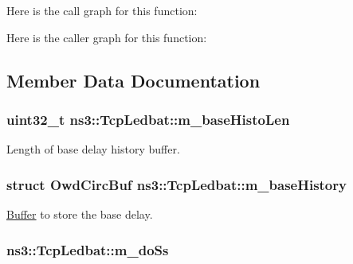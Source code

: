 Here is the call graph for this function\+:




Here is the caller graph for this function\+:




\subsection{Member Data Documentation}
\subsubsection[{\texorpdfstring{m\+\_\+base\+Histo\+Len}{m_baseHistoLen}}]{\setlength{\rightskip}{0pt plus 5cm}uint32\+\_\+t ns3\+::\+Tcp\+Ledbat\+::m\+\_\+base\+Histo\+Len\hspace{0.3cm}{\ttfamily [private]}}\hypertarget{classns3_1_1TcpLedbat_ab72482ecda86d4f7f54c75dfeaa39eb2}{}\label{classns3_1_1TcpLedbat_ab72482ecda86d4f7f54c75dfeaa39eb2}


Length of base delay history buffer. 

\subsubsection[{\texorpdfstring{m\+\_\+base\+History}{m_baseHistory}}]{\setlength{\rightskip}{0pt plus 5cm}struct {\bf Owd\+Circ\+Buf} ns3\+::\+Tcp\+Ledbat\+::m\+\_\+base\+History\hspace{0.3cm}{\ttfamily [private]}}\hypertarget{classns3_1_1TcpLedbat_a26c9974e30e4cacc5e57613c2014445f}{}\label{classns3_1_1TcpLedbat_a26c9974e30e4cacc5e57613c2014445f}


\hyperlink{classns3_1_1Buffer}{Buffer} to store the base delay. 

\subsubsection[{\texorpdfstring{m\+\_\+do\+Ss}{m_doSs}}]{ ns3\+::\+Tcp\+Ledbat\+::m\+\_\+do\+Ss\hspace{0.3cm}{\ttfamily [private]}}\hypertarget{classns3_1_1TcpLedbat_a0514fe7772b42629f333f96e636d9a8d}{}\label{classns3_1_1TcpLedbat_a0514fe7772b42629f333f96e636d9a8d}


